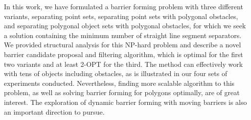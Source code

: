 In this work, we have formulated a barrier forming problem with three
different variants, separating point sets, separating point sets with polygonal obstacles, and separating polygonal object sets with polygonal obstacles, for which we seek a solution containing the minimum number of straight line segment separators. 
We provided structural analysis for this NP-hard problem and describe
a novel barrier candidate proposal and filtering algorithm, which is optimal for the first two variants and at least 2-OPT for the third.
%
The method can effectively work with tens of objects including obstacles, as is illustrated in our four sets of experiments conducted. 
%
Nevertheless, finding more scalable algorithm to this problem, as well as solving barrier forming for polygons optimally, are of great interest.
The exploration of dynamic barrier forming with moving barriers is also an important direction to pursue.
